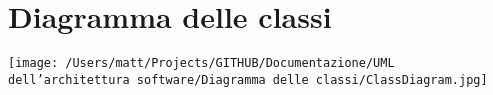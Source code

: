 \chapter{Diagramma delle classi}

\texttt{[image: /Users/matt/Projects/GITHUB/Documentazione/UML dell'architettura software/Diagramma delle classi/ClassDiagram.jpg]}
